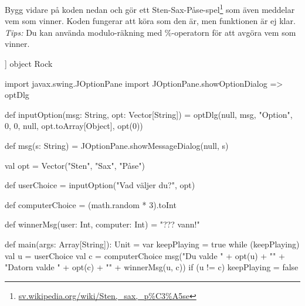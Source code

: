 \Task Bygg vidare på koden nedan och gör ett Sten-Sax-Påse-spel\footnote{\href{https://sv.wikipedia.org/wiki/Sten,\_sax,\_p\%C3\%A5se}{sv.wikipedia.org/wiki/Sten,\_sax,\_p\%C3\%A5se}} som även meddelar vem som vinner. Koden fungerar att köra som den är, men funktionen  är ej klar. \emph{Tips:} Du kan använda modulo-räkning med \%-operatorn för att avgöra vem som vinner.

\begin{Code}[basicstyle=\ttfamily\footnotesize\selectfont]]
object Rock {
  import javax.swing.JOptionPane
  import JOptionPane.{showOptionDialog => optDlg}
  
  def inputOption(msg: String, opt: Vector[String]) = 
    optDlg(null, msg, "Option", 0, 0, null, opt.toArray[Object], opt(0))
    
  def msg(s: String) = JOptionPane.showMessageDialog(null, s)  
  
  val opt =  Vector("Sten", "Sax", "Påse")
   
  def userChoice = inputOption("Vad väljer du?", opt)
  
  def computerChoice = (math.random * 3).toInt     
  
  def winnerMsg(user: Int, computer: Int) = "??? vann!"
  
  def main(args: Array[String]): Unit = {
    var keepPlaying = true
    while (keepPlaying) {
      val u = userChoice
      val c = computerChoice
      msg("Du valde " + opt(u) + "\n" + 
          "Datorn valde " + opt(c) + "\n" + 
          winnerMsg(u, c))
      if (u != c) keepPlaying = false 
    }
  }
}
\end{Code}